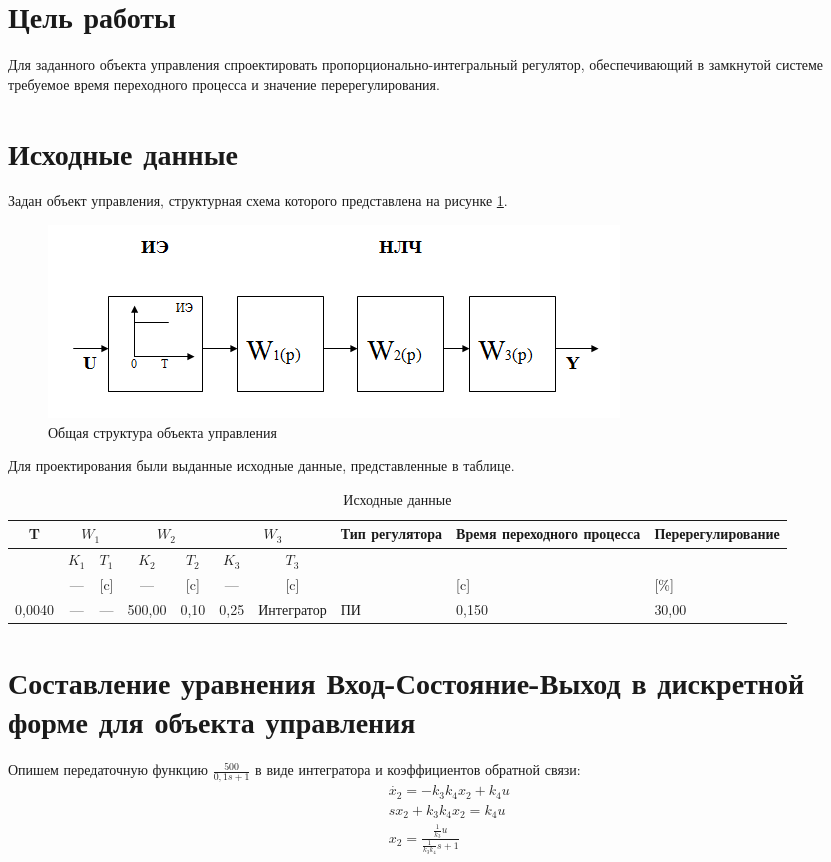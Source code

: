 \documentclass[fleqn, a4paper, 11pt, russian]{article}
\begin{document}
	
	
	\section*{Цель работы}
	Для заданного объекта управления спроектировать пропорционально-интегральный регулятор, обеспечивающий в замкнутой системе требуемое время переходного процесса и значение перерегулирования.
	\section*{Исходные данные}
	Задан объект управления, структурная схема которого представлена на рисунке \ref{struct}.
	\begin{figure}[ht!]
		\centering
		\includegraphics[scale = 1]{struct}
		\caption{Общая структура объекта управления}
		\label{struct}
	\end{figure}
	
	Для проектирования были выданные исходные данные, представленные в таблице.
	\begin{table}[h]
		\caption{Исходные данные}
		\begin{tabular}{| c | c | c | c | c | c | c | C{2cm} | C{2cm} | C{2cm}|}
			\hline
			T &  &  &  & Тип регулятора & Время переходного процесса & Перерегулирование\\
			\hline
			& $K_1$ & $T_1$ &$K_2$ & $T_2$ & $K_3$ & $T_3$ & & &\\
			\hline
			[c] & --- & [c] & --- & [c] & --- & [c] & & [c] & [\%]\\
			,0040 & --- & --- & 500,00 & 0,10 & 0,25 & Интегратор & ПИ & 0,150 & 30,00\\
			\hline
		\end{tabular}
	\end{table}
	\clearpage
	\section{Составление уравнения Вход-Состояние-Выход в дискретной форме для объекта управления}
	Опишем передаточную функцию $\displaystyle{\frac{500}{0,1s + 1}}$ в виде интегратора и коэффициентов обратной связи:
	\begin{align}
		&&\dot{x_2} = -k_3k_4x_2 + k_4u\\
		&&sx_2 + k_3k_4x_2 = k_4u\\
		&&x_2 = \frac{\displaystyle{\frac{1}{k_3}}u}{\displaystyle{\frac{1}{k_3k_4}}s + 1}
	\end{align}
	
\end{document}
